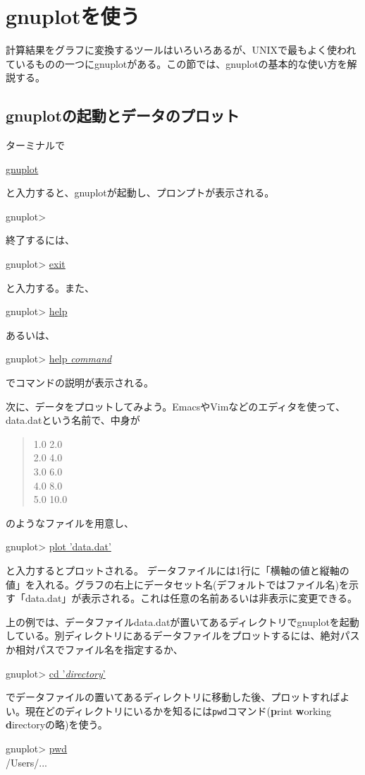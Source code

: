 \section{gnuplotを使う}
\label{sec:unix:gnuplot}

計算結果をグラフに変換するツールはいろいろあるが、UNIXで最もよく使われているものの一つにgnuplotがある。この節では、gnuplotの基本的な使い方を解説する。

\subsection{gnuplotの起動とデータのプロット}

ターミナルで
\begin{commandline2}
    \prompt \underline{gnuplot}
\end{commandline2} \noindent
と入力すると、gnuplotが起動し、プロンプトが表示される。
\begin{commandline2}
    gnuplot>
\end{commandline2} \noindent
終了するには、
\begin{commandline2}
    gnuplot> \underline{exit}
\end{commandline2} \noindent
と入力する。また、
\begin{commandline2}
    gnuplot> \underline{help}
\end{commandline2} \noindent
あるいは、
\begin{commandline2}
    gnuplot> \underline{help \textit{command}}
\end{commandline2} \noindent
でコマンドの説明が表示される。

次に、データをプロットしてみよう。EmacsやVimなどのエディタを使って、data.datという名前で、中身が
\begin{quote}
    1.0 2.0 \\
    2.0 4.0 \\
    3.0 6.0 \\
    4.0 8.0 \\
    5.0 10.0
\end{quote}
のようなファイルを用意し、
\begin{commandline2}
    gnuplot> \underline{plot 'data.dat'}
\end{commandline2} \noindent
と入力するとプロットされる。 データファイルには1行に「横軸の値と縦軸の値」を入れる。グラフの右上にデータセット名(デフォルトではファイル名)を示す「data.dat」が表示される。これは任意の名前あるいは非表示に変更できる。

上の例では、データファイルdata.datが置いてあるディレクトリでgnuplotを起動している。別ディレクトリにあるデータファイルをプロットするには、絶対パスか相対パスでファイル名を指定するか、
\begin{commandline2}
    gnuplot> \underline{cd '\textit{directory}'}
\end{commandline2} \noindent
でデータファイルの置いてあるディレクトリに移動した後、プロットすればよい。現在どのディレクトリにいるかを知るには\texttt{pwd}コマンド(\textbf{p}rint \textbf{w}orking \textbf{d}irectoryの略)を使う。
\begin{commandline2}
    gnuplot> \underline{pwd}\\
    /Users/...
\end{commandline2} \noindent

